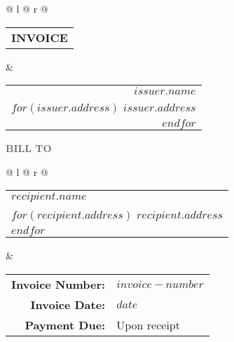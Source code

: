 \documentclass[a4paper,$fontsize$]{article}
\begin{document}
\begin{tabular*}{\textwidth}{@ {}l @{\extracolsep{\fill}} r @{}}
  \begin{tabular}[b]{@{} l}
    {\fontsize{30}{30}\selectfont\textbf{\uppercase{Invoice}}}
  \end{tabular} &
  \begin{tabular}[b]{r @{}}
    \textbf{$issuer.name$} \\
    $for(issuer.address)$
    $issuer.address$ \\
    $endfor$
  \end{tabular}
\end{tabular*}

\vspace{1.8em}
\noindent\makebox[\linewidth]{\textcolor{LightGray}{{\rule{\paperwidth}{0.6pt}}}}%
\vspace{1.8em}

\noindent\textcolor{DimGray}{\large\textbf{\uppercase{Bill to}}} \\ \medskip
\begin{tabular*}{\textwidth}{@{} l @{\extracolsep{\fill}} r @{}}
  \begin{tabular}[t]{@{} l}
    \textbf{$recipient.name$} \\
    $for(recipient.address)$
    $recipient.address$ \\
    $endfor$
  \end{tabular} &
  \begin{tabular}[t]{@{} r @{\hspace{0.7em}} l @{}}
    \textbf{Invoice Number:} & $invoice-number$ \\
    \textbf{Invoice Date:} & $date$ \\
    \textbf{Payment Due:} & Upon receipt
  \end{tabular}
\end{tabular*}

\vspace{2em}
\end{document}
